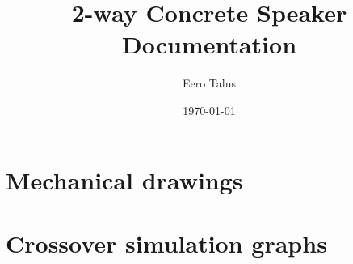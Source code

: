 \documentclass[10pt]{article}
\title{2-way Concrete Speaker Documentation}
\author{Eero Talus}
\date{\today}
\begin{document}
\begin{titlingpage}
\maketitle
\tableofcontents
\end{titlingpage}

\pagebreak
\null
\vfil
\centering\section{Mechanical drawings}
\vfil
\pagebreak







\pagebreak
\null
\vfil
\centering\section{Crossover simulation graphs}
\vfil
\pagebreak






\end{document}
